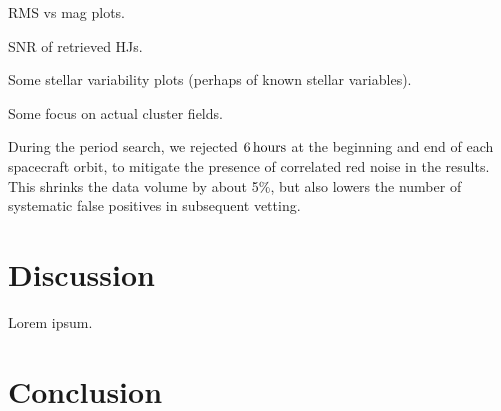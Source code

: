 \documentclass[12pt,twocolumn,tighten]{aastex62}
\begin{document}
RMS vs mag plots.

SNR of retrieved HJs.

Some stellar variability plots (perhaps of known stellar variables).

Some focus on actual cluster fields.

During the period search, we rejected $6\,{\rm hours}$ at the
beginning and end of each spacecraft orbit, to mitigate the presence
of correlated red noise in the results.
This shrinks the data volume by about 5\%, but also lowers the number
of systematic false positives in subsequent vetting.


\section{Discussion}
\label{sec:discussion}

Lorem ipsum.

\section{Conclusion}
\label{sec:conclusion}

\end{document}
